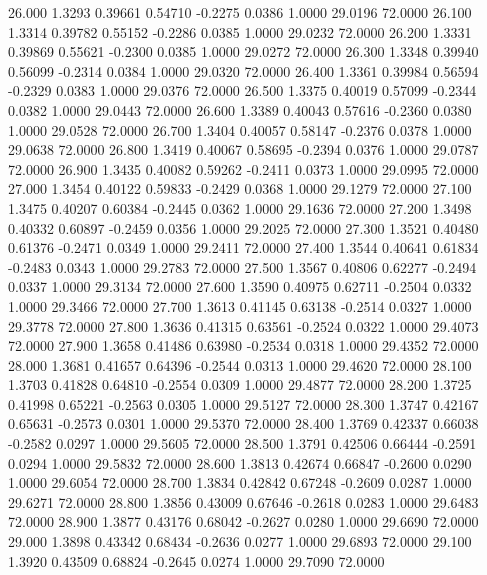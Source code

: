   26.000   1.3293   0.39661   0.54710  -0.2275   0.0386   1.0000  29.0196  72.0000
  26.100   1.3314   0.39782   0.55152  -0.2286   0.0385   1.0000  29.0232  72.0000
  26.200   1.3331   0.39869   0.55621  -0.2300   0.0385   1.0000  29.0272  72.0000
  26.300   1.3348   0.39940   0.56099  -0.2314   0.0384   1.0000  29.0320  72.0000
  26.400   1.3361   0.39984   0.56594  -0.2329   0.0383   1.0000  29.0376  72.0000
  26.500   1.3375   0.40019   0.57099  -0.2344   0.0382   1.0000  29.0443  72.0000
  26.600   1.3389   0.40043   0.57616  -0.2360   0.0380   1.0000  29.0528  72.0000
  26.700   1.3404   0.40057   0.58147  -0.2376   0.0378   1.0000  29.0638  72.0000
  26.800   1.3419   0.40067   0.58695  -0.2394   0.0376   1.0000  29.0787  72.0000
  26.900   1.3435   0.40082   0.59262  -0.2411   0.0373   1.0000  29.0995  72.0000
  27.000   1.3454   0.40122   0.59833  -0.2429   0.0368   1.0000  29.1279  72.0000
  27.100   1.3475   0.40207   0.60384  -0.2445   0.0362   1.0000  29.1636  72.0000
  27.200   1.3498   0.40332   0.60897  -0.2459   0.0356   1.0000  29.2025  72.0000
  27.300   1.3521   0.40480   0.61376  -0.2471   0.0349   1.0000  29.2411  72.0000
  27.400   1.3544   0.40641   0.61834  -0.2483   0.0343   1.0000  29.2783  72.0000
  27.500   1.3567   0.40806   0.62277  -0.2494   0.0337   1.0000  29.3134  72.0000
  27.600   1.3590   0.40975   0.62711  -0.2504   0.0332   1.0000  29.3466  72.0000
  27.700   1.3613   0.41145   0.63138  -0.2514   0.0327   1.0000  29.3778  72.0000
  27.800   1.3636   0.41315   0.63561  -0.2524   0.0322   1.0000  29.4073  72.0000
  27.900   1.3658   0.41486   0.63980  -0.2534   0.0318   1.0000  29.4352  72.0000
  28.000   1.3681   0.41657   0.64396  -0.2544   0.0313   1.0000  29.4620  72.0000
  28.100   1.3703   0.41828   0.64810  -0.2554   0.0309   1.0000  29.4877  72.0000
  28.200   1.3725   0.41998   0.65221  -0.2563   0.0305   1.0000  29.5127  72.0000
  28.300   1.3747   0.42167   0.65631  -0.2573   0.0301   1.0000  29.5370  72.0000
  28.400   1.3769   0.42337   0.66038  -0.2582   0.0297   1.0000  29.5605  72.0000
  28.500   1.3791   0.42506   0.66444  -0.2591   0.0294   1.0000  29.5832  72.0000
  28.600   1.3813   0.42674   0.66847  -0.2600   0.0290   1.0000  29.6054  72.0000
  28.700   1.3834   0.42842   0.67248  -0.2609   0.0287   1.0000  29.6271  72.0000
  28.800   1.3856   0.43009   0.67646  -0.2618   0.0283   1.0000  29.6483  72.0000
  28.900   1.3877   0.43176   0.68042  -0.2627   0.0280   1.0000  29.6690  72.0000
  29.000   1.3898   0.43342   0.68434  -0.2636   0.0277   1.0000  29.6893  72.0000
  29.100   1.3920   0.43509   0.68824  -0.2645   0.0274   1.0000  29.7090  72.0000
